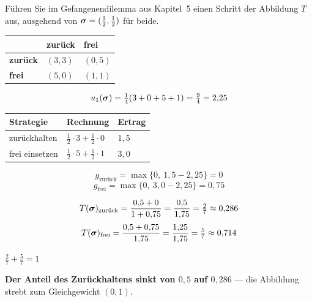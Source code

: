 \begin{aufgabe}
Führen Sie im Gefangenendilemma aus Kapitel~5 einen Schritt der Abbildung $T$ aus, ausgehend von $\boldsymbol{\sigma} = (\tfrac12,\tfrac12)$ für beide.

\loesung
{}
\begin{center}
{\small
\renewcommand{\arraystretch}{1.55}
\begin{tabular}{@{}P{2.4cm}P{2.0cm}P{2.0cm}@{}}
\toprule
& \textbf{zurück} & \textbf{frei}\\
\midrule
\textbf{zurück} & $(3,3)$ & $(0,5)$\\
\textbf{frei} & $(5,0)$ & $(1,1)$\\
\bottomrule
\end{tabular}}
\end{center}

\[ u_1(\boldsymbol{\sigma}) = \tfrac14(3+0+5+1) = \tfrac94 = 2{,}25 \]

\begin{center}
\renewcommand{\arraystretch}{1.48}
\begin{tabular}{@{}P{2.8cm}P{2.6cm}P{2.0cm}@{}}
\toprule
\textbf{Strategie} & \textbf{Rechnung} & \textbf{Ertrag}\\
\midrule
zurückhalten & $\tfrac12\cdot3+\tfrac12\cdot0$ & $1{,}5$\\
frei einsetzen & $\tfrac12\cdot5+\tfrac12\cdot1$ & $3{,}0$\\
\bottomrule
\end{tabular}
\end{center}

\[ g_{\text{zurück}} = \max\{0,\ 1{,}5-2{,}25\} = 0 \]
\[ g_{\text{frei}} = \max\{0,\ 3{,}0-2{,}25\} = 0{,}75 \]

\[ T(\boldsymbol{\sigma})_{\text{zurück}} = \frac{0{,}5 + 0}{1+0{,}75} = \frac{0{,}5}{1{,}75} = \tfrac27 \approx 0{,}286 \]
\[ T(\boldsymbol{\sigma})_{\text{frei}} = \frac{0{,}5+0{,}75}{1{,}75} = \frac{1{,}25}{1{,}75} = \tfrac57 \approx 0{,}714 \]

 $\tfrac27 + \tfrac57 = 1$ \checkmark

\begin{center}
\begin{minipage}{0.9\textwidth}
\textbf{Der Anteil des Zurückhaltens sinkt von $0{,}5$ auf $0{,}286$} --- die Abbildung strebt zum Gleichgewicht $(0,1)$.
\end{minipage}
\end{center}


\end{aufgabe}

